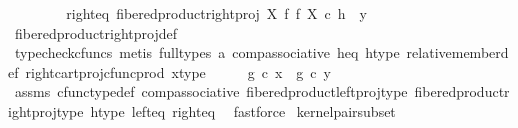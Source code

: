 \begin{isabellebody}
\ \ \ \ \isanewline
\ \ \isamarkupfalse%
\ right{\isacharunderscore}{\kern0pt}eq{\isacharcolon}{\kern0pt}\ {\isachardoublequoteopen}fibered{\isacharunderscore}{\kern0pt}product{\isacharunderscore}{\kern0pt}right{\isacharunderscore}{\kern0pt}proj\ X\ f\ f\ X\ {\isasymcirc}\isactrlsub c\ h\ {\isacharequal}{\kern0pt}\ y{\isachardoublequoteclose}\isanewline
\ \ \ \ \isamarkupfalse%
\ fibered{\isacharunderscore}{\kern0pt}product{\isacharunderscore}{\kern0pt}right{\isacharunderscore}{\kern0pt}proj{\isacharunderscore}{\kern0pt}def\isanewline
\ \ \ \ \isamarkupfalse%
\ {\isacharparenleft}{\kern0pt}typecheck{\isacharunderscore}{\kern0pt}cfuncs{\isacharcomma}{\kern0pt}\ metis\ {\isacharparenleft}{\kern0pt}full{\isacharunderscore}{\kern0pt}types{\isacharparenright}{\kern0pt}\ a{}\ comp{\isacharunderscore}{\kern0pt}associative{}\ h{\isacharunderscore}{\kern0pt}eq\ h{\isacharunderscore}{\kern0pt}type\ relative{\isacharunderscore}{\kern0pt}member{\isacharunderscore}{\kern0pt}def{}\ right{\isacharunderscore}{\kern0pt}cart{\isacharunderscore}{\kern0pt}proj{\isacharunderscore}{\kern0pt}cfunc{\isacharunderscore}{\kern0pt}prod\ x{\isacharunderscore}{\kern0pt}type{\isacharparenright}{\kern0pt}\isanewline
\isanewline
\ \ \isamarkupfalse%
\ \isamarkupfalse%
\ {\isachardoublequoteopen}g\ {\isasymcirc}\isactrlsub c\ x\ {\isacharequal}{\kern0pt}\ g\ {\isasymcirc}\isactrlsub c\ y{\isachardoublequoteclose}\isanewline
\ \ \ \ \isamarkupfalse%
\ assms{\isacharparenleft}{\kern0pt}{}{\isacharcomma}{\kern0pt}{}{\isacharcomma}{\kern0pt}{}{\isacharparenright}{\kern0pt}\ cfunc{\isacharunderscore}{\kern0pt}type{\isacharunderscore}{\kern0pt}def\ comp{\isacharunderscore}{\kern0pt}associative\ fibered{\isacharunderscore}{\kern0pt}product{\isacharunderscore}{\kern0pt}left{\isacharunderscore}{\kern0pt}proj{\isacharunderscore}{\kern0pt}type\ fibered{\isacharunderscore}{\kern0pt}product{\isacharunderscore}{\kern0pt}right{\isacharunderscore}{\kern0pt}proj{\isacharunderscore}{\kern0pt}type\ h{\isacharunderscore}{\kern0pt}type\ left{\isacharunderscore}{\kern0pt}eq\ right{\isacharunderscore}{\kern0pt}eq\ \isamarkupfalse%
\ fastforce\isanewline
{}\isamarkupfalse%
%
\endisatagproof
{\isafoldproof}%
%
\isadelimproof
\isanewline
%
\endisadelimproof
\isanewline
{}\isamarkupfalse%
\ kernel{\isacharunderscore}{\kern0pt}pair{\isacharunderscore}{\kern0pt}subset{\isacharcolon}{\kern0pt}\isanewline

\end{isabellebody}
